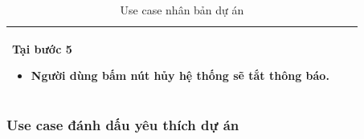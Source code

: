\documentclass[12pt,a4paper]{article}
\begin{document}
\begin{table}[H]
\begin{tabular}{|p{3.5cm}|p{11.5cm}|c|}
            Tại bước 5\newline
            \vspace{-.8cm}\begin{itemize}
                              \item Người dùng bấm nút hủy hệ thống sẽ tắt thông báo.
            \end{itemize} \\
            \hline
        \end{tabular}
        \caption{Use case nhân bản dự án }

    \end{table}


    \subsubsection*{Use case đánh dấu yêu thích dự án}
\end{document}
